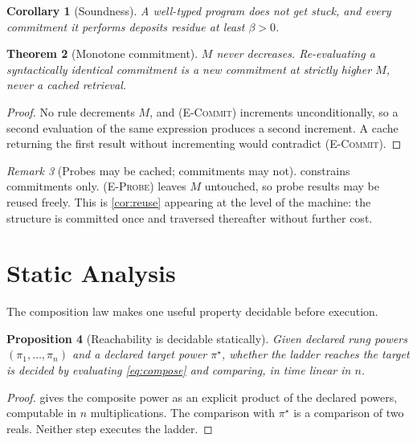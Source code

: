 \documentclass[11pt,twocolumn,a4paper]{article}
\theoremstyle{plain}
\newtheorem{theorem}{Theorem}[section]
\newtheorem{proposition}[theorem]{Proposition}
\newtheorem{corollary}[theorem]{Corollary}
\theoremstyle{definition}
\theoremstyle{remark}
\newtheorem{remark}[theorem]{Remark}
\newcommand{\flo}{\beta}
\newcommand{\pow}{\pi}
\begin{document}
\begin{corollary}[Soundness]
\label{cor:soundness}
A well-typed program does not get stuck, and every commitment it performs
deposits residue at least $\flo > 0$.
\end{corollary}

\begin{theorem}[Monotone commitment]
\label{thm:monotone}
$M$ never decreases. Re-evaluating a syntactically identical commitment is a new
commitment at strictly higher $M$, never a cached retrieval.
\end{theorem}

\begin{proof}
No rule decrements $M$, and \textsc{(E-Commit)} increments unconditionally, so a
second evaluation of the same expression produces a second increment. A cache
returning the first result without incrementing would contradict
\textsc{(E-Commit)}.
\end{proof}

\begin{remark}[Probes may be cached; commitments may not]
\label{rem:cache}
 constrains commitments only. \textsc{(E-Probe)} leaves $M$
untouched, so probe results may be reused freely. This is
\cref{cor:reuse} appearing at the level of the machine: the structure is
committed once and traversed thereafter without further cost.
\end{remark}

\section{Static Analysis}
\label{sec:static}

The composition law makes one useful property decidable before execution.

\begin{proposition}[Reachability is decidable statically]
\label{prop:reach}
Given declared rung powers $(\pow_1,\dots,\pow_n)$ and a declared target power
$\pow^\star$, whether the ladder reaches the target is decided by evaluating
\cref{eq:compose} and comparing, in time linear in $n$.
\end{proposition}

\begin{proof}
 gives the composite power as an explicit product of
the declared powers, computable in $n$ multiplications. The comparison with
$\pow^\star$ is a comparison of two reals. Neither step executes the ladder.
\end{proof}
\end{document}
